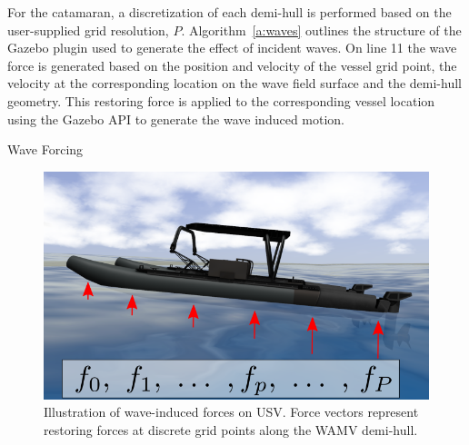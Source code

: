 \documentclass[utf8]{frontiersSCNS} %
\begin{document}
For the \wamv{} catamaran, a discretization of each demi-hull is performed based on the user-supplied grid resolution, $P$. Algorithm~\ref{a:waves} outlines the structure of the Gazebo plugin used to generate the effect of incident waves. On line 11 the wave force is generated based on the position and velocity of the vessel grid point, the velocity at the corresponding location on the wave field surface and the demi-hull geometry. This restoring force is applied to the corresponding vessel location using the Gazebo API to generate the wave induced motion.
\begin{algorithm}[H]
  \caption{Wave Forcing}
  \label{a:waves}
\end{algorithm}
\begin{figure}[H]
  \centering
  \includegraphics[width=\FigWidth\textwidth]{images/wamv_grid_v2.png}
  \caption{Illustration of wave-induced forces on USV. Force vectors represent restoring forces at discrete grid points along the WAMV demi-hull.}
  \label{f:wamv_grids}
\end{figure}
\end{document}
